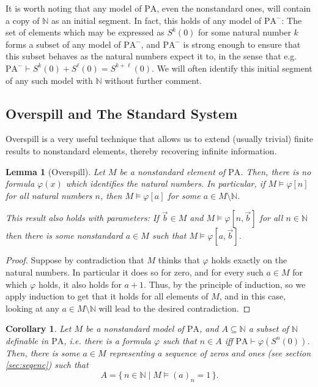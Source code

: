 \documentclass{article}
\newtheorem{lemma}[theorem]{Lemma}
\newtheorem{corollary}[theorem]{Corollary}
\theoremstyle{nonumberplain}
\newtheorem{proof}{Proof}
\newcommand{\N}{\mathbb{N}}
\newcommand{\PA}{\mathrm{PA}}
\newcommand{\WPA}{\PA^-}
\begin{document}
It is worth noting that any model of $\PA$, even the nonstandard ones, will contain a copy of $\N$ as an initial segment. In fact, this holds of any model of $\WPA$: The set of elements which may be expressed as $S^k(0)$ for some natural number $k$ forms a subset of any model of $\WPA$, and $\WPA$ is strong enough to ensure that this subset behaves as the natural numbers expect it to, in the sense that e.g. $\WPA \vdash S^k(0) + S^\ell(0) = S^{k+\ell}(0)$. We will often identify this initial segment of any such model with $\N$ without further comment.

\subsection{Overspill and The Standard System}

Overspill is a very useful technique that allows us to extend (usually trivial) finite results to nonstandard elements, thereby recovering infinite information.

\begin{lemma}[Overspill]\label{lem:overspill}
Let $M$ be a nonstandard element of $\PA$. Then, there is no formula $\varphi(x)$ which identifies the natural numbers. In particular, if $M \vDash \varphi[n]$ for all natural numbers $n$, then $M \vDash \varphi[a]$ for some $a \in M \setminus \N$.

This result also holds with parameters: If $\vec b \in M$ and $M \vDash \varphi[n,\vec b]$ for all $n \in \N$ then there is some nonstandard $a \in M$ such that $M \vDash \varphi[a,\vec b]$.
\end{lemma}

\begin{proof}
Suppose by contradiction that $M$ thinks that $\varphi$ holds exactly on the natural numbers. In particular it does so for zero, and for every such $a \in M$ for which $\varphi$ holds, it also holds for $a+1$. Thus, by the principle of induction, so we apply induction to get that it holds for all elements of $M$, and in this case, looking at any $a \in M \setminus \N$ will lead to the desired contradiction.
\end{proof}

\begin{corollary}\label{cor:nsrep}
Let $M$ be a nonstandard model of $\PA$, and $A \subseteq \N$ a subset of $\N$ definable in $\PA$, i.e. there is a formula $\varphi$ such that $n \in A$ iff $\PA \vdash \varphi(S^n(0))$. Then, there is some $a \in M$ representing a sequence of zeros and ones (see section \ref{sec:seqenc}) such that
\begin{equation}
A = \{\, n \in \N \mid M \vDash (a)_n = 1 \,\}.
\end{equation}
\end{corollary}
\end{document}

